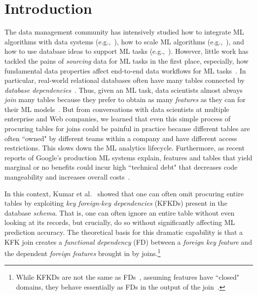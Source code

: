 \documentclass{vldb}
\begin{document}
\section{Introduction}
The data management community has intensively studied how to integrate ML algorithms 
with data systems (e.g.,~\cite{madlib,ore,bismarck,riot}), how to scale ML 
algorithms (e.g.,~\cite{systemml,graphlab}), and how to use database 
ideas to support ML tasks (e.g.,~\cite{columbus2,mlbase}).
However, little work has tackled the pains of \textit{sourcing} data for ML tasks in the first place,
especially, how fundamental data properties affect end-to-end data workflows for ML tasks~\cite{brainwash}.
%
In particular, real-world relational databases often have many tables connected by 
\textit{database dependencies}~\cite{cowbook}. Thus, given an ML task, data scientists 
almost always \textit{join} many tables because they prefer to obtain as many \textit{features} 
as they can for their ML models~\cite{orion}. But from conversations with data scientists 
at multiple enterprise and Web companies, we learned that even this simple process of 
procuring tables for joins could be painful in practice because different tables are often 
``owned" by different teams within a company and have different access restrictions. This 
slows down the ML analytics lifecycle. Furthermore, as recent reports of Google's production 
ML systems explain, features and tables that yield marginal or no benefits could incur 
high ``technical debt" that decreases code mangeability and increases overall costs~\cite{techdebt,googletutorial}.

In this context, Kumar et al.~\cite{hamlet} showed that one can often omit procuring entire 
tables by exploiting \textit{key foreign-key dependencies} (KFKDs) present in the database
\textit{schema}. That is, one can often ignore an entire table without even looking at its 
records, but crucially, do so without significantly affecting ML prediction accuracy. 
The theoretical basis for this dramatic capability is that a KFK join creates a \textit{functional dependency} 
(FD) between a \textit{foreign key feature} and the dependent \textit{foreign features} brought in 
by joins.\footnote{While KFKDs are not the same as FDs~\cite{avibook}, assuming features have
``closed" domains, they behave essentially as FDs in the output of the join~\cite{hamlet}.}
\end{document}
